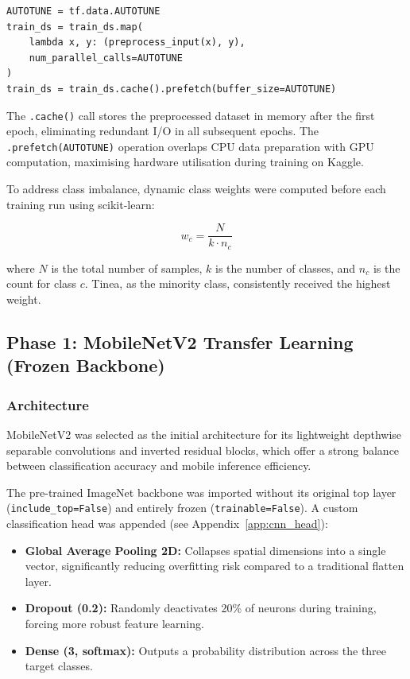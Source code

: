 \begin{verbatim}
AUTOTUNE = tf.data.AUTOTUNE
train_ds = train_ds.map(
    lambda x, y: (preprocess_input(x), y),
    num_parallel_calls=AUTOTUNE
)
train_ds = train_ds.cache().prefetch(buffer_size=AUTOTUNE)
\end{verbatim}

The \texttt{.cache()} call stores the preprocessed dataset in memory after the first epoch, eliminating redundant I/O in all subsequent epochs. The \texttt{.prefetch(AUTOTUNE)} operation overlaps CPU data preparation with GPU computation, maximising hardware utilisation during training on Kaggle.

To address class imbalance, dynamic class weights were computed before each training run using scikit-learn:

\begin{equation}
w_c = \frac{N}{k \cdot n_c}
\end{equation}

where $N$ is the total number of samples, $k$ is the number of classes, and $n_c$ is the count for class $c$. Tinea, as the minority class, consistently received the highest weight.

\subsection{Phase 1: MobileNetV2 Transfer Learning (Frozen Backbone)}
\label{sec:phase1}

\subsubsection{Architecture}

MobileNetV2 was selected as the initial architecture for its lightweight depthwise separable convolutions and inverted residual blocks, which offer a strong balance between classification accuracy and mobile inference efficiency.

The pre-trained ImageNet backbone was imported without its original top layer (\texttt{include\_top=False}) and entirely frozen (\texttt{trainable=False}). A custom classification head was appended (see Appendix~\ref{app:cnn_head}):

\begin{itemize}
    \item \textbf{Global Average Pooling 2D:} Collapses spatial dimensions into a single vector, significantly reducing overfitting risk compared to a traditional flatten layer.
    \item \textbf{Dropout (0.2):} Randomly deactivates 20\% of neurons during training, forcing more robust feature learning.
    \item \textbf{Dense (3, softmax):} Outputs a probability distribution across the three target classes.
\end{itemize}

